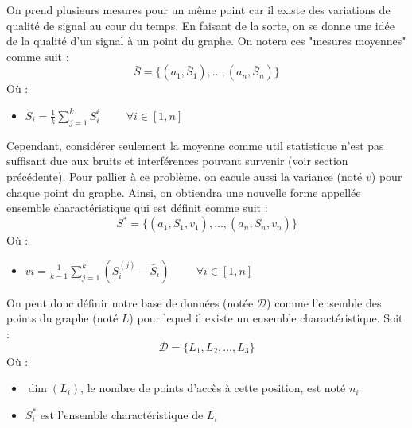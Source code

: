\documentclass[11pt,journal,compsoc]{IEEEtran}
\begin{document}
        On prend plusieurs mesures pour un même point car il existe des variations de qualité de signal au cour du temps. En faisant de la sorte, on se donne une idée de la qualité d'un signal à un point du graphe. On notera ces "mesures moyennes" comme suit :
        \[\bar{S} = \{(a_{1}, \bar{S}_{1}), ..., (a_{n}, \bar{S}_{n})\}\]
        Où :
        \begin{itemize}
          \item $\bar{S}_{i} = \frac{1}{k}\sum\limits_{j = 1}^{k} S_{i}^{i} \hspace{1cm} \forall i \in [1, n]$
        \end{itemize}
        Cependant, considérer seulement la moyenne comme util statistique n'est pas suffisant due aux bruits et interférences pouvant survenir (voir section précédente). Pour pallier à ce problème, on cacule aussi la variance (noté $v$) pour chaque point du graphe. Ainsi, on obtiendra une nouvelle forme appellée ensemble charactéristique qui est définit comme suit :
        \[S^{*} = \{(a_{1}, \bar{S}_{1}, v_{1}), ..., (a_{n}, \bar{S}_{n}, v_{n})\}\]
        Où :
        \begin{itemize}
          \item $v{i} = \frac{1}{k-1}\sum\limits_{j = 1}^{k}(S_{i}^{(j)}-\bar{S}_{i}) \hspace{1cm} \forall i \in [1,n]$
        \end{itemize}
        On peut donc définir notre base de données (notée $\mathcal{D}$) comme l'ensemble des points du graphe (noté $L$) pour lequel il existe un ensemble charactéristique. Soit : 
        \[\mathcal{D} = \{L_{1}, L_{2}, ..., L_{3}\}\]
        Où :
        \begin{itemize}
          \item $\dim(L_{i})$, le nombre de points d'accès à cette position, est noté $n_{i}$
          \item $S_{i}^{*}$ est l'ensemble charactéristique de $L_{i}$ 
        \end{itemize}
        
\end{document}
